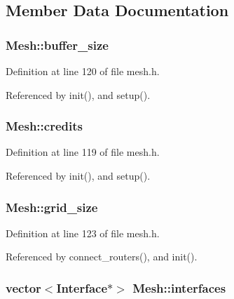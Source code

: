 \subsection{Member Data Documentation}
\subsubsection[{buffer\_\-size}]{ {\bf Mesh::buffer\_\-size}\hspace{0.3cm}{\tt  [private]}}\label{classMesh_f37fe94ec3960a966c8e740f8126aaf9}




Definition at line 120 of file mesh.h.

Referenced by init(), and setup().
\subsubsection[{credits}]{ {\bf Mesh::credits}\hspace{0.3cm}{\tt  [private]}}\label{classMesh_2c9993f1d8e97db8abad7311664660c2}




Definition at line 119 of file mesh.h.

Referenced by init(), and setup().
\subsubsection[{grid\_\-size}]{ {\bf Mesh::grid\_\-size}\hspace{0.3cm}{\tt  [private]}}\label{classMesh_843efbdd51b3f9ad9996a9e366e7df1d}




Definition at line 123 of file mesh.h.

Referenced by connect\_\-routers(), and init().
\subsubsection[{interfaces}]{\setlength{\rightskip}{0pt plus 5cm}vector$<${\bf Interface}$\ast$$>$ {\bf Mesh::interfaces}}\label{classMesh_9ebde4264da1ba6e8f24bd2a24d05ef8}




